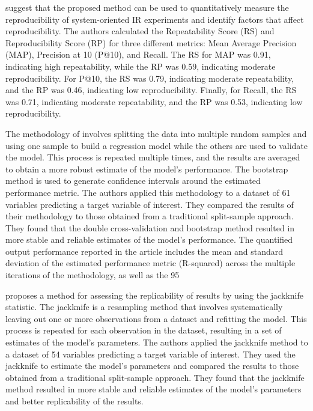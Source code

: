 \documentclass[12pt, a4paper, twocolumn]{article}
\begin{document}
			\citet{Breuer2020} suggest that the proposed method can be used to quantitatively measure the reproducibility of system-oriented IR experiments and identify factors that affect reproducibility. The authors calculated the Repeatability Score (RS) and Reproducibility Score (RP) for three different metrics: Mean Average Precision (MAP), Precision at 10 (P@10), and Recall. The RS for MAP was 0.91, indicating high repeatability, while the RP was 0.59, indicating moderate reproducibility. For P@10, the RS was 0.79, indicating moderate repeatability, and the RP was 0.46, indicating low reproducibility. Finally, for Recall, the RS was 0.71, indicating moderate repeatability, and the RP was 0.53, indicating low reproducibility.

			The methodology of \citet{Ang1998} involves splitting the data into multiple random samples and using one sample to build a regression model while the others are used to validate the model. This process is repeated multiple times, and the results are averaged to obtain a more robust estimate of the model's performance. The bootstrap method is used to generate confidence intervals around the estimated performance metric. The authors applied this methodology to a dataset of 61 variables predicting a target variable of interest. They compared the results of their methodology to those obtained from a traditional split-sample approach. They found that the double cross-validation and bootstrap method resulted in more stable and reliable estimates of the model's performance. The quantified output performance reported in the article includes the mean and standard deviation of the estimated performance metric (R-squared) across the multiple iterations of the methodology, as well as the 95%

			\citet{Ang1998Evaluate}proposes a method for assessing the replicability of results by using the jackknife statistic. The jackknife is a resampling method that involves systematically leaving out one or more observations from a dataset and refitting the model. This process is repeated for each observation in the dataset, resulting in a set of estimates of the model's parameters. The authors applied the jackknife method to a dataset of 54 variables predicting a target variable of interest. They used the jackknife to estimate the model's parameters and compared the results to those obtained from a traditional split-sample approach. They found that the jackknife method resulted in more stable and reliable estimates of the model's parameters and better replicability of the results.
\end{document}
